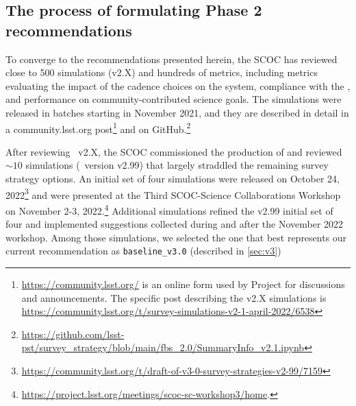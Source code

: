 \subsection{The process of formulating Phase 2 recommendations}\label{ssec:process}


To converge to the recommendations presented herein, the SCOC has reviewed close to 500 simulations (v2.X) and hundreds of metrics, including metrics evaluating the impact of the cadence choices on the system, compliance with the , and performance on community-contributed science goals. The simulations were released in batches starting in November 2021, and they are described in detail in a  community.lsst.org post\footnote{\url{https://community.lsst.org/} is an online form used by Project for discussions and announcements. The specific post describing the v2.X simulations is \url{https://community.lsst.org/t/survey-simulations-v2-1-april-2022/6538}} and on GitHub.\footnote{\url{https://github.com/lsst-pst/survey_strategy/blob/main/fbs_2.0/SummaryInfo_v2.1.ipynb}}

After reviewing \opsim\ v2.X, the SCOC commissioned the production of and reviewed $\sim 10$ simulations (\opsim\ version v2.99) that largely straddled the remaining survey strategy options. An initial set of four simulations were released on October 24, 2022\footnote{\url{ https://community.lsst.org/t/draft-of-v3-0-survey-strategies-v2-99/7159}} and were presented at the Third SCOC-Science Collaborations Workshop on November 2-3, 2022.\footnote{\url{https://project.lsst.org/meetings/scoc-sc-workshop3/home}.}  Additional simulations refined the v2.99 initial set of four and implemented suggestions collected during and after the November 2022 workshop. Among those simulations, we selected the one that best represents our current recommendation as \texttt{baseline\_v3.0} (described in \autoref{sec:v3})

